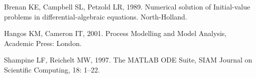 \documentclass[a4paper,11pt]{article}
\theoremstyle{definition}
\begin{document}
\begin{thebibliography}{3}
\vspace{-0.4cm}
Brenan KE, Campbell SL, Petzold LR, 1989. Numerical solution of Initial-value problems in differential-algebraic equations. North-Holland.

	Hangos KM, Cameron IT, 2001. Process Modelling and Model Analysis, Academic Press: London.

Shampine LF, Reichelt MW, 1997. The MATLAB ODE Suite, SIAM Journal on Scientific Computing, 18: 1–22.

\end{thebibliography}
\end{document}
